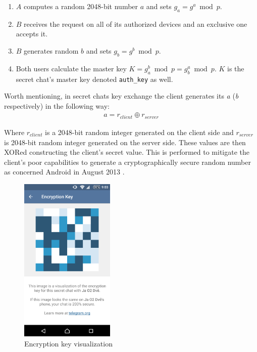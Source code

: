 \documentclass[thesis=M,english]{FITthesis}[2012/10/20]
\begin{document}
\begin{enumerate}
	\item $A$ computes a random 2048-bit number $a$ and sets $g_a = g^a \bmod p$.\label{enum:DH-a}
	\item $B$ receives the request on all of its authorized devices and an exclusive one accepts it.
	\item $B$ generates random $b$ and sets $g_b = g^b \bmod p$\label{enum:DH-b}.
	\item Both users calculate the master key $K = g_a^b \bmod p = g_b^a \bmod p$. $K$ is the secret chat's master key denoted \texttt{auth\_key} as well.
\end{enumerate}

Worth mentioning, in secret chats key exchange the client generates its \emph{a} (\emph{b} respectively) in the following way:
\begin{gather*}
a = r_{client} \oplus r_{server}
\end{gather*}

Where $r_{client}$ is a 2048-bit random integer generated on the client side and $r_{server}$ is 2048-bit random integer generated on the server side. These values are then XORed constructing the client's secret value. This is performed to mitigate the client's poor capabilities to generate a cryptographically secure random number as concerned Android in August 2013 \cite{telegram-android-securerandom}.

\begin{figure}[htb]
	\centering
	\includegraphics[width=0.4\textwidth]{telegram-keybox.png}
	\caption{Encryption key visualization}
	\label{img:telegram-keybox}
\end{figure}
\end{document}
